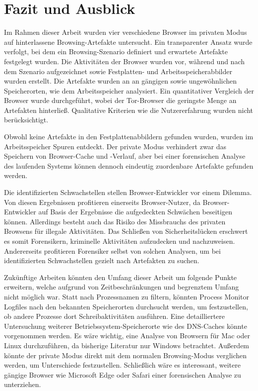 \chapter{Fazit und Ausblick}\label{chap:Fazit-Ausblick}
\thispagestyle{plain.scrheadings}
\ohead{\headmark}

Im Rahmen dieser Arbeit wurden vier verschiedene Browser im privaten Modus auf hinterlassene Browsing-Artefakte untersucht. Ein transparenter Ansatz wurde verfolgt, bei dem ein Browsing-Szenario definiert und erwartete Artefakte festgelegt wurden. Die Aktivitäten der Browser wurden vor, während und nach dem Szenario aufgezeichnet sowie Festplatten- und Arbeitsspeicherabbilder wurden erstellt. Die Artefakte wurden an an gängigen sowie ungewöhnlichen Speicherorten, wie dem Arbeitsspeicher analysiert. Ein quantitativer Vergleich der Browser wurde durchgeführt, wobei der Tor-Browser die geringste Menge an Artefakten hinterließ. Qualitative Kriterien wie die Nutzererfahrung wurden nicht berücksichtigt.

Obwohl keine Artefakte in den Festplattenabbildern gefunden wurden, wurden im Arbeitsspeicher Spuren entdeckt. Der private Modus verhindert zwar das Speichern von Browser-Cache und -Verlauf, aber bei einer forensischen Analyse des laufenden Systems können dennoch eindeutig zuordenbare Artefakte gefunden werden.

Die identifizierten Schwachstellen stellen Browser-Entwickler vor einem Dilemma.
Von diesen Ergebnissen profitieren einerseits Browser-Nutzer, da Browser-Entwickler auf Basis der Ergebnisse die aufgedeckten Schwächen beseitigen können.
Allerdings besteht auch das Risiko des Missbrauchs des privaten Browsens für illegale Aktivitäten.
Das Schließen von Sicherheitslücken erschwert es somit Forensikern, kriminelle Aktivitäten aufzudecken und nachzuweisen. 
Andererseits profitieren Forensiker selbst von solchen Analysen, um bei identifizierten Schwachstellen gezielt nach Artefakten zu suchen. 

Zukünftige Arbeiten könnten den Umfang dieser Arbeit um folgende Punkte erweitern, welche aufgrund von Zeitbeschränkungen und begrenztem Umfang nicht möglich war. Statt nach Prozessnamen zu filtern, könnten Process Monitor Logfiles nach den bekannten Speicherorten durchsucht werden, um festzustellen, ob andere Prozesse dort Schreibaktivitäten ausführen. Eine detailliertere Untersuchung weiterer Betriebssystem-Speicherorte wie des DNS-Caches könnte vorgenommen werden. Es wäre wichtig, eine Analyse von Browsern für Mac oder Linux durchzuführen, da bisherige Literatur nur Windows betrachtet. Außerdem könnte der private Modus direkt mit dem normalen Browsing-Modus verglichen werden, um Unterschiede festzustellen. Schließlich wäre es interessant, weitere gängige Browser wie Microsoft Edge oder Safari einer forensischen Analyse zu unterziehen.

